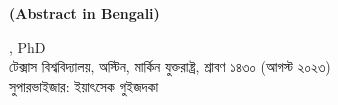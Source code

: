 \documentclass[letterpaper, nobind]{templates/ociamthesis}
\begin{document}
\begin{romanpages}

\newpage
\begin{center}
  \textbf{ (Abstract in Bengali)}\\
  
  \vspace{18pt}
  
  \begin{spacing}{2}
  \end{spacing}

  \vspace{18pt}

  \begin{spacing}{1.4}
    , 
    PhD\\
    টেক্সাস বিশ্ববিদ্যালয়, অস্টিন, মার্কিন যুক্তরাষ্ট্র, 
    শ্রাবণ ১৪৩০ (আগস্ট ২০২৩)\\
    \vspace{18pt}
    সুপারভাইজার: ইয়াৎসেক গুইজদকা
  \end{spacing}

\end{center}


\end{romanpages}
\end{document}

